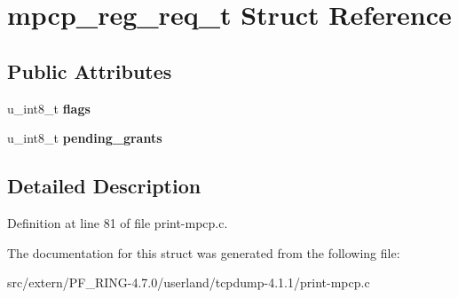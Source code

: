 \hypertarget{structmpcp__reg__req__t}{
\section{mpcp\_\-reg\_\-req\_\-t Struct Reference}
\label{structmpcp__reg__req__t}
}
\subsection*{Public Attributes}
\begin{DoxyCompactItemize}
\item 
\hypertarget{structmpcp__reg__req__t_aa16e039e575b7459e38979e088b76ae6}{
u\_\-int8\_\-t {\bfseries flags}}
\label{structmpcp__reg__req__t_aa16e039e575b7459e38979e088b76ae6}

\item 
\hypertarget{structmpcp__reg__req__t_a57bc5785f9245a9edeb22b26bf6ef5cd}{
u\_\-int8\_\-t {\bfseries pending\_\-grants}}
\label{structmpcp__reg__req__t_a57bc5785f9245a9edeb22b26bf6ef5cd}

\end{DoxyCompactItemize}


\subsection{Detailed Description}


Definition at line 81 of file print-\/mpcp.c.



The documentation for this struct was generated from the following file:\begin{DoxyCompactItemize}
\item 
src/extern/PF\_\-RING-\/4.7.0/userland/tcpdump-\/4.1.1/print-\/mpcp.c\end{DoxyCompactItemize}
